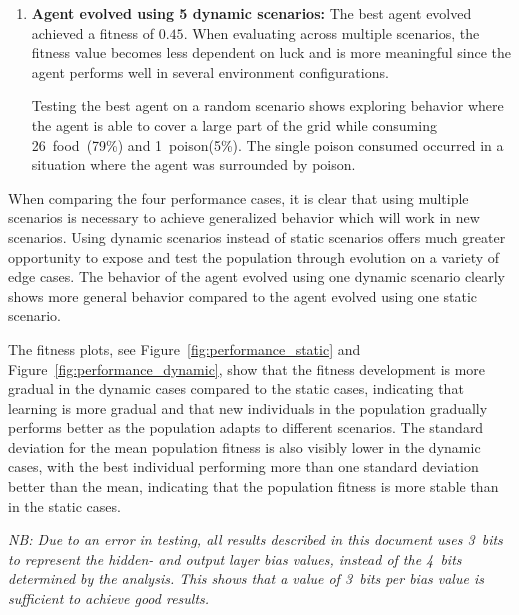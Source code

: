 \documentclass[paper=a4, fontsize=11pt]{scrartcl}
\begin{document}
\begin{enumerate}
\item \textbf{Agent evolved using 5 dynamic scenarios:} The best agent evolved achieved a fitness of $0.45$. When evaluating across multiple scenarios, the fitness value becomes less dependent on luck and is more meaningful since the agent performs well in several environment configurations.

Testing the best agent on a random scenario shows exploring behavior where the agent is able to cover a large part of the grid while consuming 26~food~(79\%) and 1~poison(5\%). The single poison consumed occurred in a situation where the agent was surrounded by poison.
\end{enumerate}

When comparing the four performance cases, it is clear that using multiple scenarios is necessary to achieve generalized behavior which will work in new scenarios. Using dynamic scenarios instead of static scenarios offers much greater opportunity to expose and test the population through evolution on a variety of edge cases. The behavior of the agent evolved using one dynamic scenario clearly shows more general behavior compared to the agent evolved using one static scenario.

The fitness plots, see Figure~\ref{fig:performance_static} and Figure~\ref{fig:performance_dynamic}, show that the fitness development is more gradual in the dynamic cases compared to the static cases, indicating that learning is more gradual and that new individuals in the population gradually performs better as the population adapts to different scenarios. The standard deviation for the mean population fitness is also visibly lower in the dynamic cases, with the best individual performing more than one standard deviation better than the mean, indicating that the population fitness is more stable than in the static cases.

\textit{NB: Due to an error in testing, all results described in this document uses 3~bits to represent the hidden- and output layer bias values, instead of the 4~bits determined by the analysis. This shows that a value of 3~bits per bias value is sufficient to achieve good results.}
\end{document}
